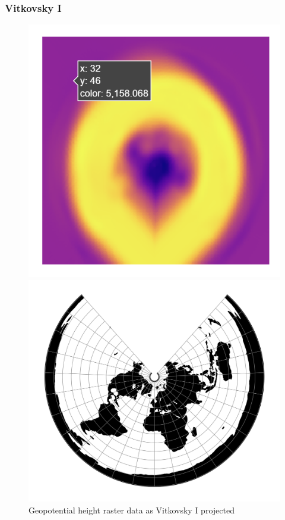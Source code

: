 \subsubsection*{Vitkovsky I}
\begin{figure}[h]
    \centering
    \begin{minipage}{0.30\textwidth}
        \centering
        \includegraphics[width=0.9\linewidth]{figures/chapter-8/geopoth_vitk.png}
        \caption{ Geopotential height raster data as Vitkovsky I projected}
        \label{fig:vitk_geopoth_raster}
    \end{minipage}\hfill
    \begin{minipage}{0.30\textwidth}
        \centering
        \includegraphics[width=0.9\linewidth]{figures/chapter-8/vitk1.png}

\end{minipage}
\end{figure}
